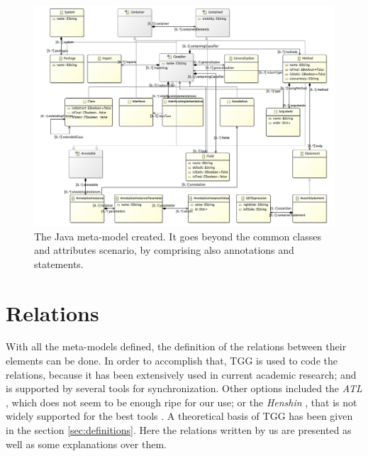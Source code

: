 \documentclass[tuberlin,cic,tc,english,noabntcite]{iiufrgs}
\begin{document}
\begin{figure}[h]
    \caption{The Java meta-model created. It goes beyond the common classes and attributes scenario, by comprising also annotations and statements.}
    \begin{center}
        \includegraphics[width=40em]{java_metamodel}
    \end{center}
    \label{fig:java_metamodel}
\end{figure}

\section{Relations}
With all the meta-models defined, the definition of the relations between their elements can be done. In order to accomplish that, TGG is used to code the relations, because it has been extensively used in current academic research; and is supported by several tools for synchronization. Other options included the \emph{ATL} \citep{jouault2008atl}, which does not seem to be enough ripe for our use; or the \emph{Henshin} \citep{arendt2010henshin}, that is not widely supported for the best tools \citep{hildebrandt2013survey}. A theoretical basis of TGG has been given in the section \ref{sec:definitions}. Here the relations written by us are presented as well as some explanations over them.
\end{document}
